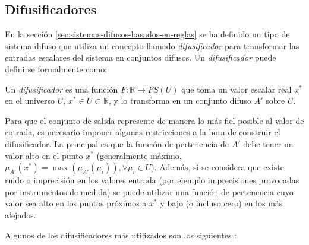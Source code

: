 \subsection{Difusificadores}\label{sec:difusificadores}

En la sección \ref{sec:sistemas-difusos-basados-en-reglas} se ha definido un tipo de sistema difuso que utiliza un concepto llamado \emph{difusificador} para transformar las entradas escalares del sistema en conjuntos difusos. Un \emph{difusificador} puede definirse formalmente como:

\begin{definition}\label{def:difusificador}
Un \emph{difusificador} es una función $F:\mathbb{R} \rightarrow FS(U)$ que toma un valor escalar real $x^{*}$ en el universo $U$, $x^{*}\in U \subset \mathbb{R}$, y lo transforma en un conjunto difuso $A'$ sobre $U$.
\end{definition}

Para que el conjunto de salida represente de manera lo más fiel posible al valor de entrada, es necesario imponer algunas restricciones a la hora de construir el difusificador. La principal es que la función de pertenencia de $A'$ debe tener un valor alto en el punto $x^*$ (generalmente máximo, $\mu_{A'}(x^*) = \max(\mu_{A'}(\mu_{i})),\forall \mu_{i} \in U$). Además, si se considera que existe ruido o imprecisión en los valores entrada (por ejemplo imprecisiones provocadas por instrumentos de medida) se puede utilizar una función de pertenencia cuyo valor sea alto en los puntos próximos a $x^*$ y bajo (o incluso cero) en los más alejados.

Algunos de los difusificadores más utilizados son los siguientes \cite{wang1997}:

